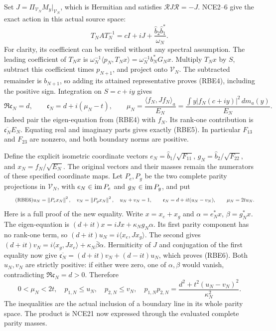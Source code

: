 Set \(J=\Pi_{\mathcal V_N}M_y|_{\mathcal V_N}\), which is
Hermitian and satisfies \(\mathcal RJ\mathcal R=-J\).
NCE2--6 give the exact action in this actual source space:
\begin{equation}\tag{RBE4}
 T_NAT_N^{-1}=cI+iJ+
             \frac{\widehat b_2\widehat b_1^*}{\omega_N}.
\end{equation}
For clarity, its coefficient can be verified without any spectral
assumption. The leading coefficient of \(T_Nx\) is
\(\omega_N^{-1}\langle p_N,T_Nx\rangle
=\omega_N^{-1}b_N^*G_Nx\). Multiply \(T_Nx\) by \(S\),
subtract this coefficient times \(p_{N+1}\), and project onto
\(\mathcal V_N\). The subtracted remainder is \(b_{N+1}\),
so adding its attained representative proves (RBE4), including
the positive sign. Integration on \(S=c+iy\) gives
\begin{equation}\tag{RBE5}
 \Re\mathfrak c_N=d,\qquad
 \mathfrak c_N=d+i(\mu_N-t),\qquad
 \mu_N=\frac{\langle f_N,Jf_N\rangle_a}{E_N}
       =\frac{\int y|f_N(c+iy)|^2\,dm_a(y)}{E_N}.
\end{equation}
Indeed pair the eigen-equation from (RBE4) with \(f_N\).
Its rank-one contribution is \(\overline{\mathfrak c_N}E_N\).
Equating real and imaginary parts gives exactly (RBE5).
In particular \(F_{13}\) and \(F_{23}\) are nonzero, and
both boundary norms are positive.

Define the explicit isometric coordinate vectors
\(e_N=\widehat b_1/\sqrt{F_{11}}\),
\(g_N=\widehat b_2/\sqrt{F_{22}}\), and
\(x_N=f_N/\sqrt{E_N}\). The original vectors and their masses
remain the numerators of these specified coordinate maps.
Let \(P_e,P_g\) be the two complete parity projections in
\(\mathcal V_N\), with \(e_N\in\operatorname{im} P_e\) and
\(g_N\in\operatorname{im} P_g\), and put
\begin{equation}\tag{RBE6}
 u_N=\left\lVert P_ex_N\right\rVert^2,\quad v_N=\left\lVert P_gx_N\right\rVert^2,\quad
 u_N+v_N=1,\qquad
 \mathfrak c_N=d+it(u_N-v_N),\qquad \mu_N=2tu_N.
\end{equation}
Here is a full proof of the new equality. Write \(x=x_e+x_g\)
and \(\alpha=e_N^*x\), \(\beta=g_N^*x\).
The eigen-equation is
\((d+it)x=iJx+\kappa_Ng_N\alpha\). Its first parity component
has no rank-one term, so
\((d+it)u_N=i\langle x_e,Jx_g\rangle\).
The second gives
\((d+it)v_N=i\langle x_g,Jx_e\rangle+
\kappa_N\bar\beta\alpha\).
Hermiticity of \(J\) and conjugation of the first equality now
give \(\overline{\mathfrak c_N}=(d+it)v_N+(d-it)u_N\),
which proves (RBE6). Both \(u_N,v_N\) are strictly positive:
if either were zero, one of \(\alpha,\beta\) would vanish,
contradicting \(\Re\mathfrak c_N=d>0\).
Therefore
\begin{equation}\tag{RBE7}
 0<\mu_N<2t,\quad
 p_{1,N}\le u_N,\quad p_{2,N}\le v_N,\quad
 p_{1,N}p_{2,N}=\frac{d^2+t^2(u_N-v_N)^2}{\kappa_N^2}.
\end{equation}
The inequalities are the actual inclusion of a boundary line in
its whole parity space. The product is NCE21 now expressed through
the evaluated complete parity masses.

